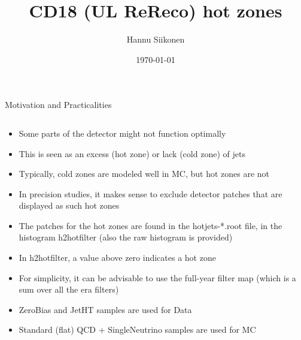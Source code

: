 \documentclass[9pt]{beamer}
\title[CD18 (UL ReReco) hot zones]{CD18 (UL ReReco) hot zones}
\author{Hannu Siikonen}
\institute{Helsinki Institute of Physics \\ \vspace{0.25cm} Instructor Adj.~Prof.~Mikko~Voutilainen}
\date{\today}
\begin{document}
\begin{frame}[t]
\titlepage
\end{frame}

\begin{frame}[t]{Motivation and Practicalities}
\begin{columns}[T]
\begin{column}{\textwidth}
\begin{itemize}
 \item Some parts of the detector might not function optimally
 \item This is seen as an excess (hot zone) or lack (cold zone) of jets
 \item Typically, cold zones are modeled well in MC, but hot zones are not
 \item In precision studies, it makes sense to exclude detector patches that are displayed as such hot zones
 \item The patches for the hot zones are found in the hotjets-*.root file, in the histogram h2hotfilter (also the raw histogram is provided)
 \item In h2hotfilter, a value above zero indicates a hot zone
 \item For simplicity, it can be advisable to use the full-year filter map (which is a sum over all the era filters)
 \item ZeroBias and JetHT samples are used for Data
 \item Standard (flat) QCD + SingleNeutrino samples are used for MC
\end{itemize}
\end{column}
\end{columns}
\end{frame}
\end{document}
